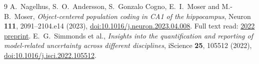 \documentclass[11pt,a4paper]{article}
\begin{document}
\begin{thebibliography}{9}
 A.~Nagelhus, S.~O.~Andersson, S.~Gonzalo Cogno, E.~I.~Moser and M.-B.~Moser, \emph{Object-centered population coding in CA1 of the hippocampus}, Neuron \textbf{111}, 2091--2104.e14 (2023), \href{https://doi.org/10.1016/j.neuron.2023.04.008}{doi:10.1016/j.neuron.2023.04.008}. Full text read: \href{https://doi.org/10.1101/2022.07.07.499197}{2022 preprint}.
 E.~G.~Simmonds et al., \emph{Insights into the quantification and reporting of model-related uncertainty across different disciplines}, iScience \textbf{25}, 105512 (2022), \href{https://doi.org/10.1016/j.isci.2022.105512}{doi:10.1016/j.isci.2022.105512}.
\end{thebibliography}
\end{document}
